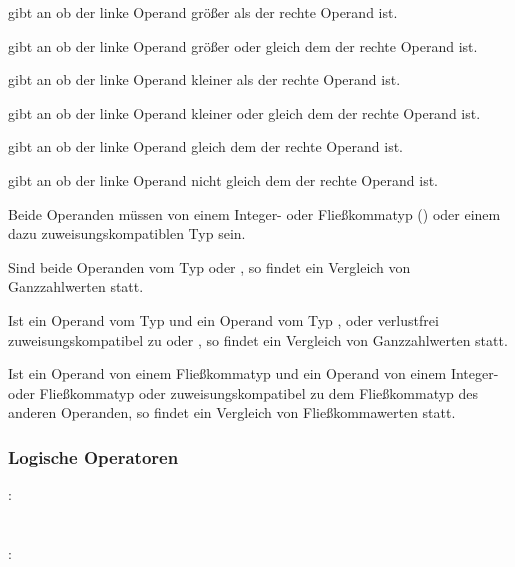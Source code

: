 \op{>} gibt an ob der linke Operand größer als der rechte Operand ist.

\op{>=} gibt an ob der linke Operand größer oder gleich dem der rechte Operand ist.

\op{<} gibt an ob der linke Operand kleiner als der rechte Operand ist.

\op{<=} gibt an ob der linke Operand kleiner oder gleich dem der rechte Operand ist.

\op{==} gibt an ob der linke Operand gleich dem der rechte Operand ist.

\op{!=} gibt an ob der linke Operand nicht gleich dem der rechte Operand ist.

Beide Operanden müssen von einem Integer- oder Fließkommatyp () oder einem
dazu zuweisungskompatiblen Typ sein.

Sind beide Operanden vom Typ  oder , so findet ein Vergleich von Ganzzahlwerten statt.

Ist ein Operand vom Typ  und ein Operand vom Typ ,  oder
verlustfrei zuweisungskompatibel zu  oder , so findet ein Vergleich von Ganzzahlwerten statt.

Ist ein Operand von einem Fließkommatyp und ein Operand von einem Integer- oder Fließkommatyp
oder zuweisungskompatibel zu dem Fließkommatyp des anderen Operanden,
so findet ein Vergleich von Fließkommawerten statt.


\subsubsection{Logische Operatoren}\label{Logische Operatoren}
:\label{asdr_logisch_oder}\\
\hspace*{1cm} \\
\hspace*{1cm} \glq\Gt{||}\grq  {} \\
:\label{asdr_logisch_und}\\
\hspace*{1cm} \\
\hspace*{1cm} \glq\Gt{\&\&}\grq  {} \\

